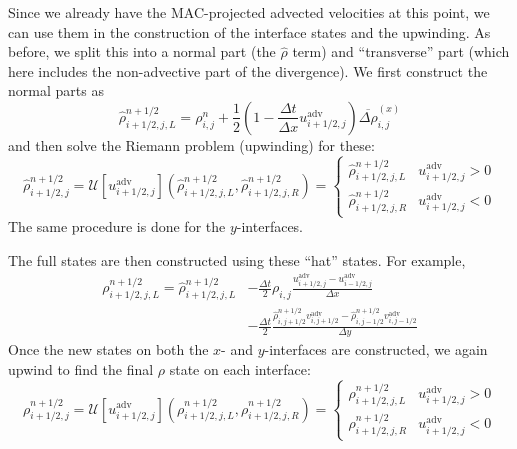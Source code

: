 \begin{enumerate}
Since we already have the MAC-projected advected velocities at this
point, we can use them in the construction of the interface states and
the upwinding.  As before, we split this into a normal part (the
$\hat{\rho}$ term) and ``transverse'' part (which here includes the
non-advective part of the divergence).  We first construct the normal
parts as
\begin{equation}
\hat{\rho}_{i+1/2,j,L}^{n+1/2} = \rho_{i,j}^n + 
   \frac{1}{2} \left ( 1 - \frac{\Delta t}{\Delta x} u^\mathrm{adv}_{i+1/2,j} \right )
   \overline{\Delta \rho}^{(x)}_{i,j}
\end{equation}
and then solve the Riemann problem (upwinding) for these:
\begin{equation}
\hat{\rho}_{i+1/2,j}^{n+1/2} = 
   \mathcal{U}[u^\mathrm{adv}_{i+1/2,j}](\hat{\rho}_{i+1/2,j,L}^{n+1/2},
                                     \hat{\rho}_{i+1/2,j,R}^{n+1/2}) =
  \left \{
  \begin{array}{cl}
     \hat{\rho}_{i+1/2,j,L}^{n+1/2} & u^\mathrm{adv}_{i+1/2,j} > 0 \\
     \hat{\rho}_{i+1/2,j,R}^{n+1/2} & u^\mathrm{adv}_{i+1/2,j} < 0 
  \end{array} \right .
\end{equation}
The same procedure is done for the $y$-interfaces.

The full states are then constructed using these ``hat'' states.  For example,
\begin{align}
\rho_{i+1/2,j,L}^{n+1/2} = \hat{\rho}_{i+1/2,j,L}^{n+1/2} 
   &- \frac{\Delta t}{2} \rho_{i,j} 
     \frac{u^\mathrm{adv}_{i+1/2,j} - u^\mathrm{adv}_{i-1/2,j}}{\Delta x} \nonumber \\
   &- \frac{\Delta t}{2} 
        \frac{\hat{\rho}_{i,j+1/2}^{n+1/2} v^\mathrm{adv}_{i,j+1/2} -
              \hat{\rho}_{i,j-1/2}^{n+1/2} v^\mathrm{adv}_{i,j-1/2}}{\Delta y}
\end{align}
Once the new states on both the $x$- and $y$-interfaces are constructed, we
again upwind to find the final $\rho$ state on each interface:
\begin{equation}
\rho_{i+1/2,j}^{n+1/2} = 
   \mathcal{U}[u^\mathrm{adv}_{i+1/2,j}](\rho_{i+1/2,j,L}^{n+1/2},
                                     \rho_{i+1/2,j,R}^{n+1/2}) =
  \left \{
  \begin{array}{cl}
     \rho_{i+1/2,j,L}^{n+1/2} & u^\mathrm{adv}_{i+1/2,j} > 0 \\
     \rho_{i+1/2,j,R}^{n+1/2} & u^\mathrm{adv}_{i+1/2,j} < 0 
  \end{array} \right .
\end{equation}



\end{enumerate}
